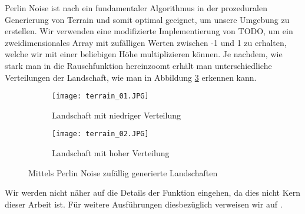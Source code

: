 
Perlin Noise ist nach \cite{parberry2015modeling} ein fundamentaler Algorithmus in der prozeduralen Generierung von Terrain und somit optimal geeignet, um unsere Umgebung zu erstellen. Wir verwenden eine modifizierte Implementierung von TODO, um ein zweidimensionales Array mit zufälligen Werten zwischen -1 und 1 zu erhalten, welche wir mit einer beliebigen Höhe multiplizieren können. Je nachdem, wie stark man in die Rauschfunktion \glqq hereinzoomt\grqq{} erhält man unterschiedliche Verteilungen der Landschaft, wie man in Abbildung \ref{img:randomTerrain} erkennen kann.

\begin{figure}[H]
    \centering
    \begin{subfigure}[b]{0.49\textwidth}
        \texttt{[image: terrain\_01.JPG]}
        \caption{Landschaft mit niedriger Verteilung}
        \label{img:randomTerrainA}
    \end{subfigure}
    \begin{subfigure}[b]{0.49\textwidth}
        \texttt{[image: terrain\_02.JPG]}
        \caption{Landschaft mit hoher Verteilung}
        \label{img:randomTerrainB}
    \end{subfigure}
    \caption{Mittels Perlin Noise zufällig generierte Landschaften}
    \label{img:randomTerrain}
\end{figure}

Wir werden nicht näher auf die Details der Funktion eingehen, da dies nicht Kern dieser Arbeit ist. Für weitere Ausführungen diesbezüglich verweisen wir auf \cite{archer2011procedurally}.


